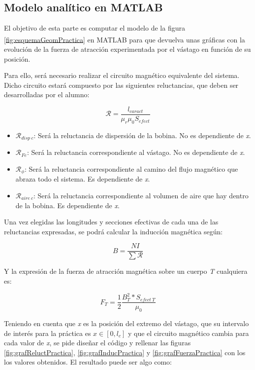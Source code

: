 \subsection*{Modelo analítico en MATLAB\textsuperscript{\textregistered}}

El objetivo de esta parte es computar el modelo de la figura \ref{fig:esquemaGeomPractica} en MATLAB\textsuperscript{\textregistered} para que devuelva unas gráficas con la evolución de la fuerza de atracción experimentada por el vástago en función de su posición.

Para ello, será necesario realizar el circuito magnético equivalente del sistema. Dicho circuito estará compuesto por las siguientes reluctancias, que deben ser desarrolladas por el alumno:

\[\mathcal{R} = \frac{l_{caract}}{\mu_r\mu_0 S_{efect}}\]

\begin{itemize}
    \item \(\mathcal{R}_{disp~c}\): Será la reluctancia de dispersión de la bobina. No es dependiente de \textit{x}.
    \item \(\mathcal{R}_{Fe}\): Será la reluctancia correspondiente al vástago. No es dependiente de \textit{x}.
    \item \(\mathcal{R}_{\phi}\): Será la reluctancia correspondiente al camino del flujo magnético que abraza todo el sistema. Es dependiente de \textit{x}.
    \item \(\mathcal{R}_{aire~c}\): Será la reluctancia correspondiente al volumen de aire que hay dentro de la bobina. Es dependiente de \textit{x}.
\end{itemize}

Una vez elegidas las longitudes y secciones efectivas de cada una de las reluctancias expresadas, se podrá calcular la inducción magnética según:

\[B = \frac{NI}{\sum\mathcal{R}}\]

Y la expresión de la fuerza de atracción magnética sobre un cuerpo \textit{T} cualquiera es:

\[F_T = \frac{1}{2} \frac{B_T^2*S_{efect~T}}{\mu_0}\]

Teniendo en cuenta que \textit{x} es la posición del extremo del vástago, que su intervalo de interés para la práctica es \(x\in [0, l_c]\) y que el circuito magnético cambia para cada valor de \textit{x}, se pide diseñar el código y rellenar las figuras \ref{fig:grafReluctPractica}, \ref{fig:grafInducPractica} y \ref{fig:grafFuerzaPractica} con los los valores obtenidos. El resultado puede ser algo como:

